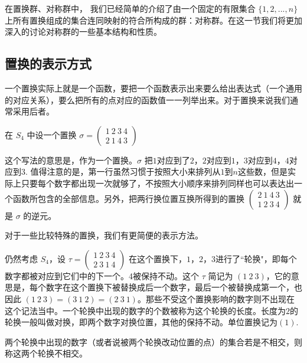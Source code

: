 

在置换群、对称群中， 我们已经简单的介绍了由一个固定的有限集合 $\{1, 2, ..., n\}$ 上所有置换组成的集合连同映射的符合所构成的群：对称群。在这一节我们将更加深入的讨论对称群的一些基本结构和性质。

\subsection{置换的表示方式}
一个置换实际上就是一个函数，要把一个函数表示出来要么给出表达式（一个通用的对应关系），要么把所有的点对应的函数值一一列举出来。对于置换来说我们通常采用后者。
\begin{example}{}\label{ex_permu_1}
在 $S_4$ 中设一个置换 $\sigma=\begin{pmatrix}
1\ 2\ 3\ 4\\ 2\ 1\ 4\ 3
\end{pmatrix}$
\end{example}
这个写法的意思是，作为一个置换。$\sigma$ 把$1$对应到了$2$，$2$对应到$1$，$3$对应到$4$，$4$对应到$3$. 值得注意的是，第一行虽然习惯于按照大小来排列从$1$到$n$这些数，但是实际上只要每个数字都出现一次就够了，不按照大小顺序来排列同样也可以表达出一个函数所包含的全部信息。另外，把两行换位置互换所得到的置换
$\begin{pmatrix}
2\ 1\ 4\ 3\\ 1\ 2\ 3\ 4
\end{pmatrix}$
就是 $\sigma$ 的逆元。


对于一些比较特殊的置换，我们有更简便的表示方法。
\begin{example}{}
仍然考虑 $S_4$，设 $\tau=\begin{pmatrix}
1\ 2\ 3\ 4\\ 2\ 3\ 1\ 4
\end{pmatrix}$ 在这个置换下，$1$，$2$，$3$进行了“轮换"，即每个数字都被对应到它们中的下一个。4被保持不动。这个 $\tau$ 简记为 $(1\ 2\ 3)$，它的意思是，每个数字在这个置换下被替换成后一个数字，最后一个被替换成第一个，也因此 $(1\ 2\ 3)=(3\ 1\ 2)=(2\ 3\ 1)$。那些不受这个置换影响的数字则不出现在这个记法当中。一个轮换中出现的数字的个数被称为这个轮换的长度。长度为$2$的轮换一般叫做对换，即两个数字对换位置，其他的保持不动。单位置换记为$(1)$.
\end{example}

\begin{definition}{}
两个轮换中出现的数字（或者说被两个轮换改动位置的点）的集合若是不相交，则称这两个轮换不相交。
\end{definition}

